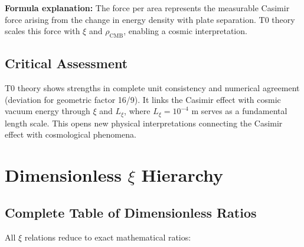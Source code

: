 	\textbf{Formula explanation:} The force per area represents the measurable Casimir force arising from the change in energy density with plate separation. T0 theory scales this force with $\xi$ and $\rho_{\text{CMB}}$, enabling a cosmic interpretation.
	
	\subsection{Critical Assessment}
	T0 theory shows strengths in complete unit consistency and numerical agreement (deviation for geometric factor 16/9). It links the Casimir effect with cosmic vacuum energy through $\xi$ and $L_\xi$, where $L_\xi = 10^{-4}$ m serves as a fundamental length scale. This opens new physical interpretations connecting the Casimir effect with cosmological phenomena.
	
	\section{Dimensionless $\xi$ Hierarchy}
	
	\subsection{Complete Table of Dimensionless Ratios}
	
	All $\xi$ relations reduce to exact mathematical ratios:
	
	\begin{table}[htbp]
		\centering
		\caption{Dimensionless $\xi$ ratios in T0 theory}
	\end{table}
	
